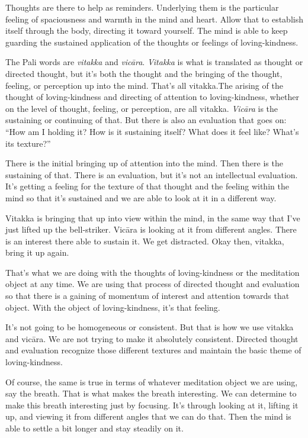 Thoughts are there to help as reminders. Underlying them is the
particular feeling of spaciousness and warmth in the mind and heart.
Allow that to establish itself through the body, directing it toward
yourself. The mind is able to keep guarding the sustained application of
the thoughts or feelings of loving-kindness.

The Pali words are \emph{vitakka} and \emph{vicāra}. \emph{Vitakka} is
what is translated as thought or directed thought, but it’s both the
thought and the bringing of the thought, feeling, or perception up into
the mind. That's all vitakka.The arising of the thought of
loving-kindness and directing of attention to loving-kindness, whether
on the level of thought, feeling, or perception, are all vitakka.
\emph{Vicāra} is the sustaining or continuing of that. But there is also
an evaluation that goes on: “How am I holding it? How is it sustaining
itself? What does it feel like? What’s its texture?”

There is the initial bringing up of attention into the mind. Then there
is the sustaining of that. There is an evaluation, but it’s not an
intellectual evaluation. It’s getting a feeling for the texture of that
thought and the feeling within the mind so that it’s sustained and we
are able to look at it in a different way.

Vitakka is bringing that up into view within the mind, in the same way
that I’ve just lifted up the bell-striker. Vicāra is looking at it from
different angles. There is an interest there able to sustain it. We get
distracted. Okay then, vitakka, bring it up again.

That’s what we are doing with the thoughts of loving-kindness or the
meditation object at any time. We are using that process of directed
thought and evaluation so that there is a gaining of momentum of
interest and attention towards that object. With the object of
loving-kindness, it’s that feeling.

It’s not going to be homogeneous or consistent. But that is how we use
vitakka and vicāra. We are not trying to make it absolutely consistent.
Directed thought and evaluation recognize those different textures and
maintain the basic theme of loving-kindness.

Of course, the same is true in terms of whatever meditation object we
are using, say the breath. That is what makes the breath interesting. We
can determine to make this breath interesting just by focusing. It’s
through looking at it, lifting it up, and viewing it from different
angles that we can do that. Then the mind is able to settle a bit longer
and stay steadily on it.

